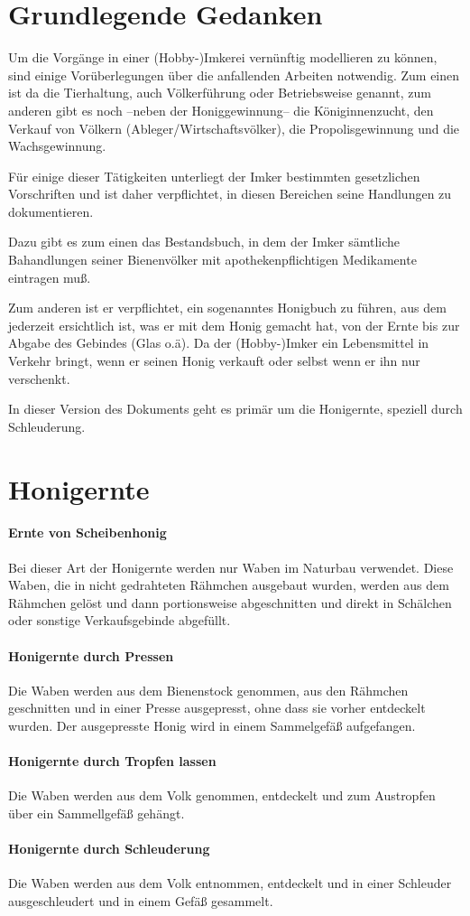 \section{Grundlegende Gedanken}

Um die Vorgänge in einer (Hobby-)Imkerei vernünftig modellieren zu können, sind einige Vorüberlegungen über die anfallenden Arbeiten notwendig. Zum einen ist da die Tierhaltung, auch Völkerführung oder Betriebsweise genannt, zum anderen gibt es noch --neben der Honiggewinnung-- die Königinnenzucht, den Verkauf von Völkern (Ableger/Wirtschaftsvölker), die Propolisgewinnung und die Wachsgewinnung. \bigskip 

Für einige dieser Tätigkeiten unterliegt der Imker bestimmten gesetzlichen Vorschriften und ist daher verpflichtet, in diesen Bereichen seine Handlungen zu dokumentieren.\medskip

Dazu gibt es zum einen das Bestandsbuch, in dem der Imker sämtliche Bahandlungen seiner Bienenvölker mit apothekenpflichtigen Medikamente eintragen muß. \medskip

Zum anderen ist er verpflichtet, ein sogenanntes Honigbuch zu führen, aus dem jederzeit ersichtlich ist, was er mit dem Honig gemacht hat, von der Ernte bis zur Abgabe des Gebindes (Glas o.ä). Da der (Hobby-)Imker ein Lebensmittel in Verkehr bringt, wenn er seinen Honig verkauft oder selbst wenn er ihn nur verschenkt. \bigskip
 
In dieser Version des Dokuments geht es primär um die Honigernte, speziell durch Schleuderung.


\section{Honigernte}
\paragraph{Ernte von Scheibenhonig}
Bei dieser Art der Honigernte werden nur Waben im Naturbau verwendet. Diese Waben, die in nicht gedrahteten Rähmchen ausgebaut wurden, werden aus dem Rähmchen gelöst und dann portionsweise abgeschnitten und direkt in Schälchen oder sonstige Verkaufsgebinde abgefüllt.
\paragraph{Honigernte durch Pressen}
Die Waben werden aus dem Bienenstock genommen, aus den Rähmchen geschnitten und in einer Presse ausgepresst, ohne dass sie vorher entdeckelt wurden. Der ausgepresste Honig wird in einem Sammelgefäß aufgefangen.
\paragraph{Honigernte durch Tropfen lassen}
Die Waben werden aus dem Volk genommen, entdeckelt und zum Austropfen über ein Sammellgefäß gehängt. 
\paragraph{Honigernte durch Schleuderung}
Die Waben werden aus dem Volk entnommen, entdeckelt und in einer Schleuder ausgeschleudert und in einem Gefäß gesammelt.




 